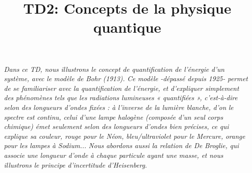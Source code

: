 \documentclass{article}
\author{}
\date{}
\title{TD2: Concepts de la physique quantique}
\begin{document}
\maketitle
\textit{Dans ce TD, nous illustrons le concept de quantification de l’énergie d’un système, avec le modèle de Bohr (1913). Ce modèle -dépassé depuis 1925- permet de se familiariser avec la quantification de l’énergie, et d’expliquer simplement des phénomènes tels que les radiations lumineuses « quantifiées », c’est-à-dire selon des longueurs d’ondes fixées : à l’inverse de la lumière blanche, d’on le spectre est continu, celui d’une lampe halogène (composée d’un seul corps chimique) émet seulement selon des longueurs d’ondes bien précises, ce qui explique sa couleur, rouge pour le Néon, bleu/ultraviolet pour le Mercure, orange pour les lampes à Sodium...}\newline
\textit{Nous abordons aussi la relation de De Broglie, qui associe une longueur d’onde à chaque particule ayant une masse, et nous illustrons le principe d’incertitude d’Heisenberg.}\newline\newline
\end{document}
